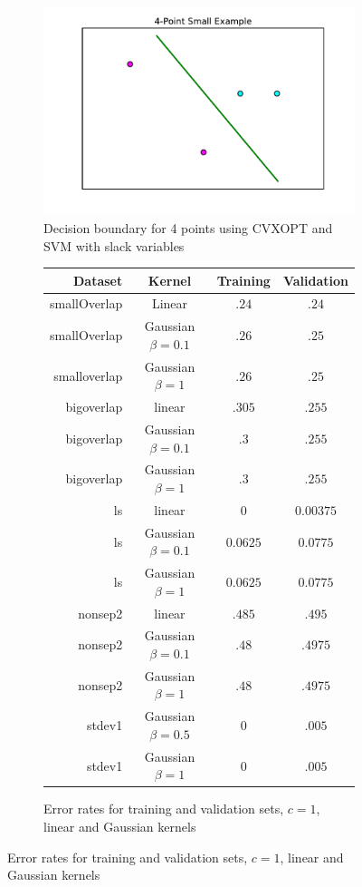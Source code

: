 \documentclass[10pt]{article}
\begin{document}
\begin{figure}[!ht]
\centering
\begin{subfigure}[b]{0.46\textwidth}
	\centering
	\includegraphics[width=\textwidth]{exercise1-1.pdf}
	\caption{Decision boundary for 4 points using CVXOPT and SVM with slack variables}
	\label{fig:1-1}
\end{subfigure}
\begin{subfigure}[b]{0.46\textwidth}
\centering
\begin{tabular}{r|c|c|c}
	Dataset & Kernel & Training & Validation \\ \hline
	smallOverlap & Linear & $.24$ & $.24$ \\
	smallOverlap & Gaussian $\beta = 0.1$ & $.26$ & $.25$ \\
	smalloverlap & Gaussian $\beta = 1$ & $.26$ & $.25$ \\
	bigoverlap & linear & $.305$ & $.255$ \\
	bigoverlap & Gaussian $\beta = 0.1$ & $.3$ & $.255$ \\
	bigoverlap & Gaussian $\beta = 1$ & $.3$ & $.255$ \\
	ls & linear & $0$ & $0.00375$ \\
	ls & Gaussian $\beta = 0.1$ & $0.0625$ & $0.0775$ \\
	ls & Gaussian $\beta = 1$ & $0.0625$ & $0.0775$ \\
	nonsep2 & linear & $.485$ & $.495$ \\
	nonsep2 & Gaussian $\beta = 0.1$ & $.48$ & $.4975$ \\
	nonsep2 & Gaussian $\beta = 1$ & $.48$ & $.4975$ \\
	stdev1 & Gaussian $\beta = 0.5$ & $0$ & $.005$ \\
	stdev1 & Gaussian $\beta = 1$ & $0$ & $.005$
\end{tabular}
\caption{Error rates for training and validation sets, $c = 1$, linear and Gaussian kernels}
\label{tbl:1-2-error}
\end{subfigure}
\end{figure}
\end{document}
